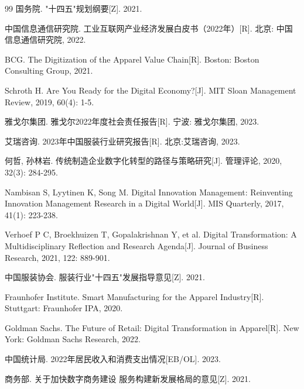 \documentclass[12pt,a4paper]{article}
\begin{document}
\begin{thebibliography}{99}
 国务院. "十四五"规划纲要[Z]. 2021.

 中国信息通信研究院. 工业互联网产业经济发展白皮书（2022年）[R]. 北京: 中国信息通信研究院, 2022.

 BCG. The Digitization of the Apparel Value Chain[R]. Boston: Boston Consulting Group, 2021.

 Schroth H. Are You Ready for the Digital Economy?[J]. MIT Sloan Management Review, 2019, 60(4): 1-5.

 雅戈尔集团. 雅戈尔2022年度社会责任报告[R]. 宁波: 雅戈尔集团, 2023.

 艾瑞咨询. 2023年中国服装行业研究报告[R]. 北京:艾瑞咨询, 2023.

 何哲, 孙林岩. 传统制造企业数字化转型的路径与策略研究[J]. 管理评论, 2020, 32(3): 284-295.

 Nambisan S, Lyytinen K, Song M. Digital Innovation Management: Reinventing Innovation Management Research in a Digital World[J]. MIS Quarterly, 2017, 41(1): 223-238.

 Verhoef P C, Broekhuizen T, Gopalakrishnan Y, et al. Digital Transformation: A Multidisciplinary Reflection and Research Agenda[J]. Journal of Business Research, 2021, 122: 889-901.

 中国服装协会. 服装行业"十四五"发展指导意见[Z]. 2021.

 Fraunhofer Institute. Smart Manufacturing for the Apparel Industry[R]. Stuttgart: Fraunhofer IPA, 2020.

 Goldman Sachs. The Future of Retail: Digital Transformation in Apparel[R]. New York: Goldman Sachs Research, 2022.

 中国统计局. 2022年居民收入和消费支出情况[EB/OL]. 2023.

 商务部. 关于加快数字商务建设 服务构建新发展格局的意见[Z]. 2021.

\end{thebibliography}
\end{document}
